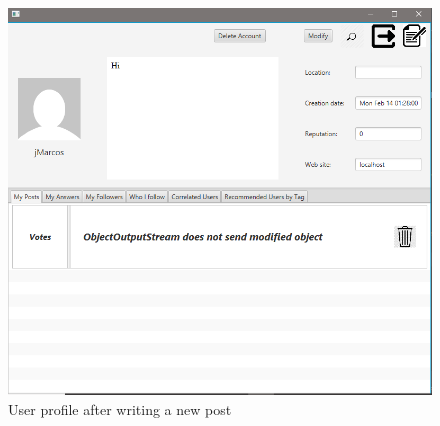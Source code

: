 \documentclass[11pt]{report}
\begin{document}
\begin{figure}[H]
  \centering
  \includegraphics[width=\textwidth,keepaspectratio=true]{img/user_manual/CreazionePost2.png}
  \caption{User profile after writing a new post}
  \label{fig:CreazionePost2}
\end{figure}
\end{document}
